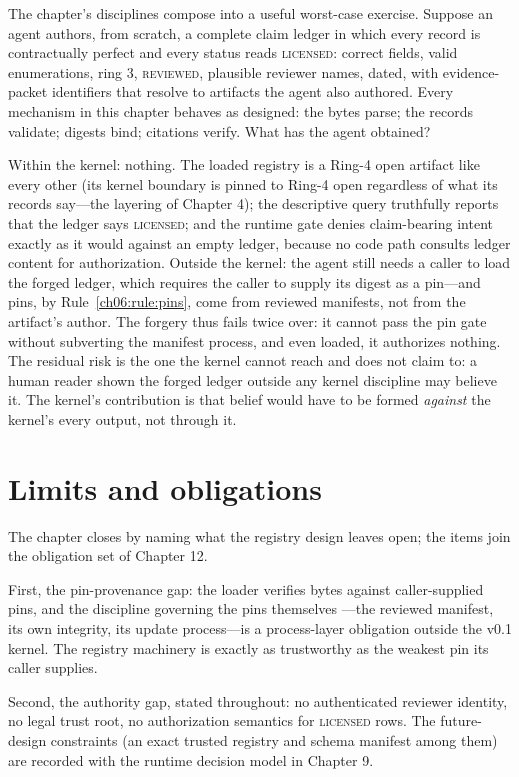 The chapter's disciplines compose into a useful worst-case exercise.
Suppose an agent authors, from scratch, a complete claim ledger in which
every record is contractually perfect and every status reads
\textsc{licensed}: correct fields, valid enumerations, ring 3,
\textsc{reviewed}, plausible reviewer names, dated, with evidence-packet
identifiers that resolve to artifacts the agent also authored. Every
mechanism in this chapter behaves as designed: the bytes parse; the
records validate; digests bind; citations verify. What has the agent
obtained?

Within the kernel: nothing. The loaded registry is a Ring-4 open
artifact like every other (its kernel boundary is pinned to Ring-4 open
regardless of what its records say---the layering of Chapter 4); the
descriptive query truthfully reports that the ledger says
\textsc{licensed}; and the runtime gate denies claim-bearing intent
exactly as it would against an empty ledger, because no code path
consults ledger content for authorization. Outside the kernel: the
agent still needs a caller to load the forged ledger, which requires
the caller to supply its digest as a pin---and pins, by
Rule~\ref{ch06:rule:pins}, come from reviewed manifests, not from the
artifact's author. The forgery thus fails twice over: it cannot pass
the pin gate without subverting the manifest process, and even loaded,
it authorizes nothing. The residual risk is the one the kernel cannot
reach and does not claim to: a human reader shown the forged ledger
outside any kernel discipline may believe it. The kernel's contribution
is that belief would have to be formed \emph{against} the kernel's
every output, not through it.

\section{Limits and obligations}\label{ch06:limits}

The chapter closes by naming what the registry design leaves open; the
items join the obligation set of Chapter 12.

First, the pin-provenance gap: the loader verifies bytes against
caller-supplied pins, and the discipline governing the pins themselves
---the reviewed manifest, its own integrity, its update process---is a
process-layer obligation outside the v0.1 kernel. The registry
machinery is exactly as trustworthy as the weakest pin its caller
supplies.

Second, the authority gap, stated throughout: no authenticated reviewer
identity, no legal trust root, no authorization semantics for
\textsc{licensed} rows. The future-design constraints (an exact trusted
registry and schema manifest among them) are recorded with the runtime
decision model in Chapter 9.

